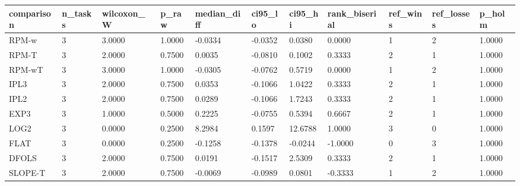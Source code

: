 \begin{tabular}{lllllllllll}
\hline
comparison & n\_tasks & wilcoxon\_W & p\_raw & median\_diff & ci95\_lo & ci95\_hi & rank\_biserial & ref\_wins & ref\_losses & p\_holm \\
\hline
RPM-w & 3 & 3.0000 & 1.0000 & -0.0334 & -0.0352 & 0.0380 & 0.0000 & 1 & 2 & 1.0000 \\
RPM-T & 3 & 2.0000 & 0.7500 & 0.0035 & -0.0810 & 0.1002 & 0.3333 & 2 & 1 & 1.0000 \\
RPM-wT & 3 & 3.0000 & 1.0000 & -0.0305 & -0.0762 & 0.5719 & 0.0000 & 1 & 2 & 1.0000 \\
IPL3 & 3 & 2.0000 & 0.7500 & 0.0353 & -0.1066 & 1.0422 & 0.3333 & 2 & 1 & 1.0000 \\
IPL2 & 3 & 2.0000 & 0.7500 & 0.0289 & -0.1066 & 1.7243 & 0.3333 & 2 & 1 & 1.0000 \\
EXP3 & 3 & 1.0000 & 0.5000 & 0.2225 & -0.0755 & 0.5394 & 0.6667 & 2 & 1 & 1.0000 \\
LOG2 & 3 & 0.0000 & 0.2500 & 8.2984 & 0.1597 & 12.6788 & 1.0000 & 3 & 0 & 1.0000 \\
FLAT & 3 & 0.0000 & 0.2500 & -0.1258 & -0.1378 & -0.0244 & -1.0000 & 0 & 3 & 1.0000 \\
DFOLS & 3 & 2.0000 & 0.7500 & 0.0191 & -0.1517 & 2.5309 & 0.3333 & 2 & 1 & 1.0000 \\
SLOPE-T & 3 & 2.0000 & 0.7500 & -0.0069 & -0.0989 & 0.0801 & -0.3333 & 1 & 2 & 1.0000 \\
\hline
\end{tabular}
